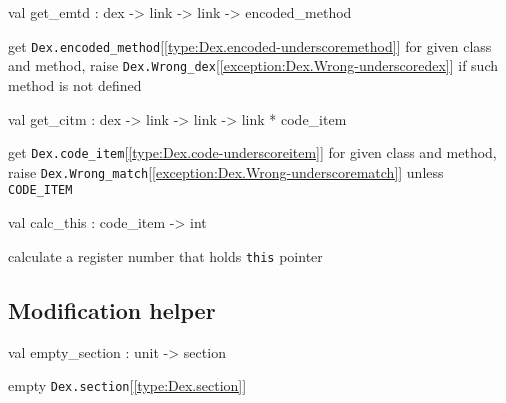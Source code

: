 \documentclass[11pt]{article}
\begin{document}
\label{val:Dex.get-underscoreemtd}\begin{ocamldoccode}
val get_emtd : dex -> link -> link -> encoded_method
\end{ocamldoccode}
\begin{ocamldocdescription}
get {\tt{Dex.encoded\_method}}[\ref{type:Dex.encoded-underscoremethod}] for given class and method,
 raise {\tt{Dex.Wrong\_dex}}[\ref{exception:Dex.Wrong-underscoredex}] if such method is not defined


\end{ocamldocdescription}




\label{val:Dex.get-underscorecitm}\begin{ocamldoccode}
val get_citm : dex -> link -> link -> link * code_item
\end{ocamldoccode}
\begin{ocamldocdescription}
get {\tt{Dex.code\_item}}[\ref{type:Dex.code-underscoreitem}] for given class and method,
 raise {\tt{Dex.Wrong\_match}}[\ref{exception:Dex.Wrong-underscorematch}] unless {\tt{CODE\_ITEM}}


\end{ocamldocdescription}




\label{val:Dex.calc-underscorethis}\begin{ocamldoccode}
val calc_this : code_item -> int
\end{ocamldoccode}
\begin{ocamldocdescription}
calculate a register number that holds {\tt{this}} pointer


\end{ocamldocdescription}




\subsection{Modification helper}




\label{val:Dex.empty-underscoresection}\begin{ocamldoccode}
val empty_section : unit -> section
\end{ocamldoccode}
\begin{ocamldocdescription}
empty {\tt{Dex.section}}[\ref{type:Dex.section}]


\end{ocamldocdescription}
\end{document}
